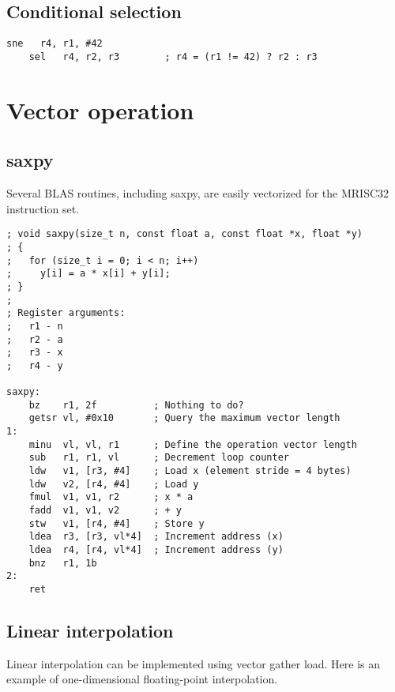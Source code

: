 \subsection{Conditional selection}

\begin{lstlisting}[style=assembler]
    sne   r4, r1, #42
    sel   r4, r2, r3        ; r4 = (r1 != 42) ? r2 : r3
\end{lstlisting}

\section{Vector operation}

\subsection{saxpy}

Several BLAS routines, including saxpy, are easily vectorized for the MRISC32
instruction set.

\begin{lstlisting}[style=assembler]
; void saxpy(size_t n, const float a, const float *x, float *y)
; {
;   for (size_t i = 0; i < n; i++)
;     y[i] = a * x[i] + y[i];
; }
;
; Register arguments:
;   r1 - n
;   r2 - a
;   r3 - x
;   r4 - y

saxpy:
    bz    r1, 2f          ; Nothing to do?
    getsr vl, #0x10       ; Query the maximum vector length
1:
    minu  vl, vl, r1      ; Define the operation vector length
    sub   r1, r1, vl      ; Decrement loop counter
    ldw   v1, [r3, #4]    ; Load x (element stride = 4 bytes)
    ldw   v2, [r4, #4]    ; Load y
    fmul  v1, v1, r2      ; x * a
    fadd  v1, v1, v2      ; + y
    stw   v1, [r4, #4]    ; Store y
    ldea  r3, [r3, vl*4]  ; Increment address (x)
    ldea  r4, [r4, vl*4]  ; Increment address (y)
    bnz   r1, 1b
2:
    ret
\end{lstlisting}

\subsection{Linear interpolation}

Linear interpolation can be implemented using vector gather load. Here is an
example of one-dimensional floating-point interpolation.

